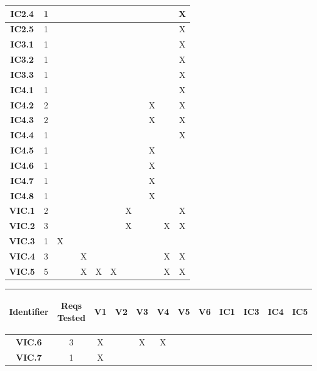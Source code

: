 \documentclass [10pt]{article}
\begin{document}
\begin{center}
\begin{tabularx} {.88\textwidth} {|c|c|c|c|c|c|c|c|c|c|c|c|}
 \textbf{IC2.4}  &1& & & & & & & &  & & X  \\ \hline 
 \textbf{IC2.5}  &1& & & & & & & &  & & X  \\ \hline 
 \textbf{IC3.1}  &1 & & & & & & &  & & & X \\ \hline
 \textbf{IC3.2}  &1& & & & & &  & & & & X  \\ \hline 
 \textbf{IC3.3}  &1& & & & &  & & & & & X  \\ \hline
  \textbf{IC4.1} &1& & & & &  & & & & & X  \\ \hline
 \textbf{IC4.2}  &2& & & & &  & & & X & & X  \\ \hline
 \textbf{IC4.3}  &2& & & & &  & & & X & & X  \\ \hline
 \textbf{IC4.4}  &1& & & & &  & & & & & X  \\ \hline
 \textbf{IC4.5}  &1& & & & &  & & & X & & \\  \hline
 \textbf{IC4.6}  &1& & & & &  & & & X & &   \\ \hline
 \textbf{IC4.7}  &1& & & & &  & & & X & &   \\ \hline
 \textbf{IC4.8}  &1& & & & &  & & & X & &   \\ \hline
 \textbf{VIC.1}  &2& & & & &  & X& & & & X  \\ \hline
 \textbf{VIC.2}  &3& & & &  & & X& & & X& X  \\ \hline
 \textbf{VIC.3}  &1& X& & &  & & & & & &   \\ \hline
 \textbf{VIC.4}  &3& & & X& & & & &  & X& X  \\ \hline
 \textbf{VIC.5}  &5& & & X& X& X& &  & & X& X  \\ \hline



\end{tabularx}

\begin{tabularx} {.88\textwidth} {|c|c|c|c|c|c|c|c|c|c|c|c|} \hline
  \hspace {1.9mm} \textbf{Identifier \hspace {1.9mm} } & \begin{minipage} {.075\columnwidth} \vspace{1mm} \begin {center}\textbf{Reqs Tested}\vspace{1mm}\end{center}\end{minipage}
 & \textbf{V1} &\textbf{V2} &\textbf{V3} &\textbf{V4} &\textbf{V5} &\textbf{V6} &\textbf{IC1}  &\textbf{IC3} &\textbf{IC4}&\textbf{IC5}  \\ \hline
  \textbf{VIC.6}&3& X& & X& X& & & & & &    \\ \hline
 \textbf{VIC.7}&1& X& & & & & & & & &   \\ \hline

 
 \end{tabularx}


\end{center}
\end{document}
